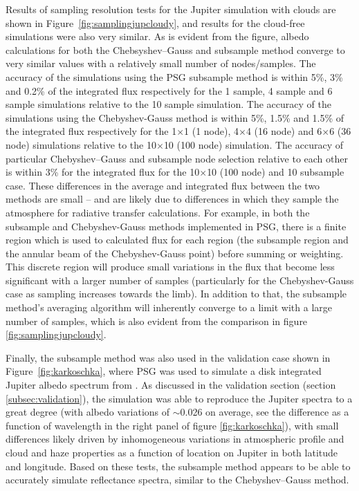 \documentclass[12pt, letterpaper]{aastex631}
\begin{document}
 Results of sampling resolution tests for the Jupiter simulation with clouds are shown in Figure~\ref{fig:samplingjupcloudy}, and results for the cloud-free simulations were also very similar.  As is evident from the figure, albedo calculations for both the Chebsyshev--Gauss and subsample method converge to very similar values with a relatively small number of nodes/samples. The accuracy of the simulations using the PSG subsample method is within 5\%, 3\% and 0.2\% of the integrated flux respectively for the 1 sample, 4 sample and 6 sample simulations relative to the 10 sample simulation.  The accuracy of the simulations using the Chebyshev-Gauss method is within 5\%, 1.5\% and 1.5\% of the integrated flux respectively for the 1$\times$1 (1 node), 4$\times$4 (16 node) and 6$\times$6 (36 node) simulations relative to the 10$\times$10 (100 node) simulation. The accuracy of particular Chebyshev--Gauss and subsample node selection relative to each other is within 3\% for the integrated flux for the 10$\times$10 (100 node) and 10 subsample case. These differences in the average and integrated flux between the two methods are small -- and are likely due to differences in which they sample the atmosphere for radiative transfer calculations.  For example, in both the subsample and Chebyshev-Gauss methods implemented in PSG, there is a finite region which is used to calculated flux for each region (the subsample region and the annular beam of the Chebyshev-Gauss point) before summing or weighting. This discrete region will produce small variations in the flux that become less significant with a larger number of samples (particularly for the Chebyshev-Gauss case as sampling increases towards the limb).  In addition to that, the subsample method's averaging algorithm will inherently converge to a limit with a large number of samples, which is also evident from the comparison in figure \ref{fig:samplingjupcloudy}.
 
 
 Finally, the subsample method was also used in the validation case shown in Figure~\ref{fig:karkoschka}, where PSG was used to simulate a disk integrated Jupiter albedo spectrum from \textcite{1994Icar..111..174K}.  As discussed in the validation section (section \ref{subsec:validation}), the simulation was able to reproduce the Jupiter spectra to a great degree (with albedo variations of $\sim$0.026 on average, see the difference as a function of wavelength in the right panel of figure \ref{fig:karkoschka}), with small differences likely driven by inhomogeneous variations in atmospheric profile and cloud and haze properties as a function of location on Jupiter in both latitude and longitude.  Based on these tests, the subsample method appears to be able to accurately simulate reflectance spectra, similar to the Chebyshev--Gauss method.
\end{document}
